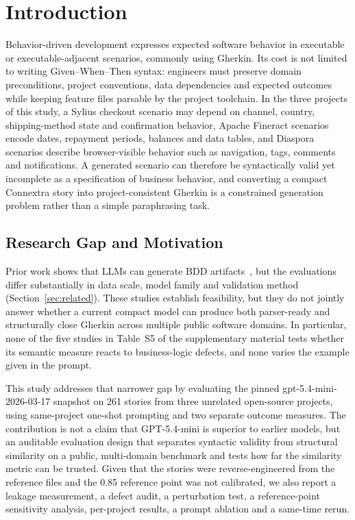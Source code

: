 \section{Introduction}
\label{sec:intro}

Behavior-driven development expresses expected software behavior in executable or executable-adjacent scenarios, commonly using Gherkin. Its cost is not limited to writing Given--When--Then syntax: engineers must preserve domain preconditions, project conventions, data dependencies and expected outcomes while keeping feature files parsable by the project toolchain. In the three projects of this study, a Sylius checkout scenario may depend on channel, country, shipping-method state and confirmation behavior, Apache Fineract scenarios encode dates, repayment periods, balances and data tables, and Diaspora scenarios describe browser-visible behavior such as navigation, tags, comments and notifications. A generated scenario can therefore be syntactically valid yet incomplete as a specification of business behavior, and converting a compact Connextra story into project-consistent Gherkin is a constrained generation problem rather than a simple paraphrasing task.

\subsection{Research Gap and Motivation}

Prior work shows that LLMs can generate BDD artifacts~\cite{rathnayake2026,karpurapu2024,ferreira2025,fernandes2025}, but the evaluations differ substantially in data scale, model family and validation method (Section~\ref{sec:related}). These studies establish feasibility, but they do not jointly answer whether a current compact model can produce both parser-ready and structurally close Gherkin across multiple public software domains. In particular, none of the five studies in Table~S5 of the supplementary material tests whether its semantic measure reacts to business-logic defects, and none varies the example given in the prompt.

This study addresses that narrower gap by evaluating the pinned gpt-5.4-mini-2026-03-17 snapshot on 261 stories from three unrelated open-source projects, using same-project one-shot prompting and two separate outcome measures. The contribution is not a claim that GPT-5.4-mini is superior to earlier models, but an auditable evaluation design that separates syntactic validity from structural similarity on a public, multi-domain benchmark and tests how far the similarity metric can be trusted. Given that the stories were reverse-engineered from the reference files and the 0.85 reference point was not calibrated, we also report a leakage measurement, a defect audit, a perturbation test, a reference-point sensitivity analysis, per-project results, a prompt ablation and a same-time rerun.

